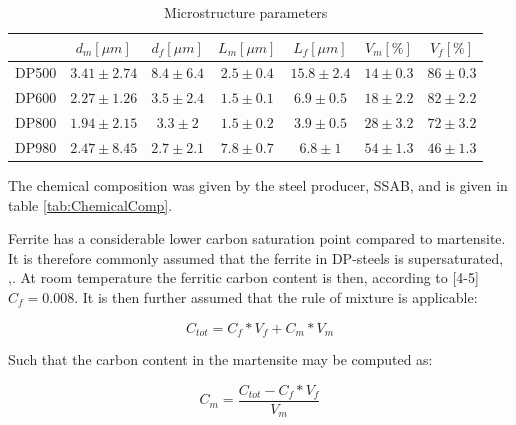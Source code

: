 \documentclass{article}
\begin{document}
\begin{center}
\begin{table}[h!]
    \centering

    \begin{tabular}{c|cccccc}
    \hline
         & $d_m [\mu m]$ & $d_f [\mu m]$ & $L_m [\mu m]$ & $L_f [\mu m]$& $V_m [\%]$& $V_f [\%]$ \\ [0.5ex]
         \hline
         \rowcolor{Gray}
         DP500 & $3.41 \pm 2.74$ & $8.4 \pm 6.4$ & $2.5 \pm 0.4$& $15.8 \pm 2.4$ & $14 \pm 0.3$ & $86 \pm 0.3$ \\
         
         DP600 &$2.27 \pm 1.26$ & $3.5 \pm 2.4$ & $1.5 \pm 0.1$& $6.9 \pm 0.5 $& $18 \pm 2.2$ & $82 \pm 2.2 $\\
         \rowcolor{Gray}
         DP800 &$1.94 \pm 2.15$& $3.3 \pm 2 $&$1.5 \pm 0.2 $& $3.9 \pm 0.5$ & $28 \pm 3.2$ &$72 \pm 3.2$ \\
         
         DP980 &$2.47 \pm 8.45 $& $2.7 \pm 2.1 $&$7.8 \pm 0.7 $& $ 6.8 \pm 1$ &$54 \pm 1.3$ & $46\pm 1.3 $\\
         \hline
    \end{tabular}
    \caption{Microstructure parameters}
    \label{tab:MicrostructurePara}
\end{table}
\end{center}



The chemical composition was given by the steel producer, SSAB, and is given in table \ref{tab:ChemicalComp}.

Ferrite has a considerable lower carbon saturation point compared to martensite. It is therefore commonly assumed that the ferrite in DP-steels is supersaturated, \cite{Calcagnotto2},\cite{Granbom}. At room temperature the ferritic carbon content is then, according to [4-5] $C_f=0.008$. It is then further assumed that the rule of mixture is applicable:

\begin{equation}
\label{Eq:RuleofMix}
  C_{tot} = C_f*V_f + C_m*V_m  
\end{equation}

Such that the carbon content in the martensite may be computed as:

\begin{equation}
\label{Eq:CalcFracMart}
  C_{m} = \frac{C_{tot}-C_f*V_f }{V_m}
\end{equation}
\end{document}
